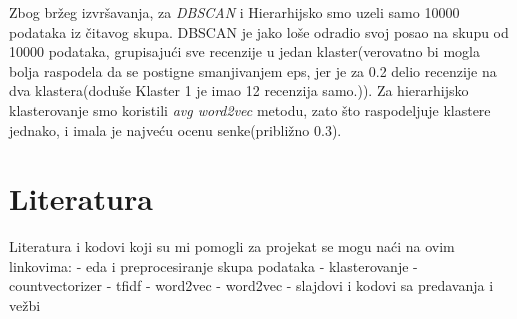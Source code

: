 \documentclass[11pt]{article}
\makeatletter
\newcommand{\boxspacing}{\kern\kvtcb@left@rule\kern\kvtcb@boxsep}
\newcommand{\prompt}[4]{
        \ttfamily\llap{{\color{#2}[#3]:\hspace{3pt}#4}}\vspace{-\baselineskip}
    }
\makeatother
\begin{document}
Zbog bržeg izvršavanja, za \emph{DBSCAN} i Hierarhijsko smo uzeli samo
10000 podataka iz čitavog skupa. DBSCAN je jako loše odradio svoj posao
na skupu od 10000 podataka, grupisajući sve recenzije u jedan
klaster(verovatno bi mogla bolja raspodela da se postigne smanjivanjem
eps, jer je za 0.2 delio recenzije na dva klastera(doduše Klaster 1 je
imao 12 recenzija samo.)). Za hierarhijsko klasterovanje smo koristili
\emph{avg word2vec} metodu, zato što raspodeljuje klastere jednako, i
imala je najveću ocenu senke(približno 0.3).

    \hypertarget{literatura}{%
\section{Literatura }\label{literatura}}

Literatura i kodovi koji su mi pomogli za projekat se mogu naći na ovim
linkovima: - eda i preprocesiranje skupa podataka - klasterovanje -
countvectorizer - tfidf - word2vec - word2vec - slajdovi i kodovi sa
predavanja i vežbi

    \begin{tcolorbox}[breakable, size=fbox, boxrule=1pt, pad at break*=1mm,colback=cellbackground, colframe=cellborder]
\prompt{In}{incolor}{ }{\boxspacing}
\begin{Verbatim}[commandchars=\\\{\}]

\end{Verbatim}
\end{tcolorbox}


    
    
    
\end{document}
